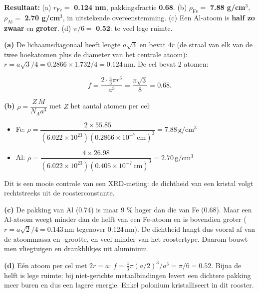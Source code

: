 \begin{oplossing}
\textbf{Resultaat:} (a) \(r_{\mathrm{Fe}} =\) \textbf{0.124 nm}, pakkingsfractie \textbf{0.68}. (b) \(\rho_{\mathrm{Fe}} =\) \textbf{7.88 g/cm\ensuremath{^{3}}}, \(\rho_{\mathrm{Al}} =\) \textbf{2.70 g/cm\ensuremath{^{3}}}, in uitstekende overeenstemming. (c) Een Al-atoom is \textbf{half zo zwaar} en \textbf{groter}. (d) \(\pi/6 =\) \textbf{0.52}: te veel lege ruimte.

\textbf{(a)} De lichaamsdiagonaal heeft lengte \(a\sqrt{3}\) en bevat \(4r\) (de straal van elk van de twee hoekatomen plus de diameter van het centrale atoom): \(r = a\sqrt{3}/4 = 0.2866 \times 1.732/4 = 0.124\,\mathrm{nm}\). De cel bevat 2 atomen:

\[
f = \frac{2\cdot\frac{4}{3}\pi r^3}{a^3} = \frac{\pi\sqrt{3}}{8} = 0.68.
\]

\textbf{(b)} \(\rho = \dfrac{Z\,M}{N_A a^3}\) met \(Z\) het aantal atomen per cel:

\begin{itemize}
\item
  Fe: \(\rho = \dfrac{2 \times 55.85}{(6.022\times10^{23})(0.2866\times10^{-7}\,\mathrm{cm})^3} = 7.88\,\mathrm{g/cm^3}\)
\item
  Al: \(\rho = \dfrac{4 \times 26.98}{(6.022\times10^{23})(0.405\times10^{-7}\,\mathrm{cm})^3} = 2.70\,\mathrm{g/cm^3}\)
\end{itemize}

Dit is een mooie controle van een XRD-meting: de dichtheid van een kristal volgt rechtstreeks uit de roosterconstante.

\textbf{(c)} De pakking van Al (0.74) is maar 9 \% hoger dan die van Fe (0.68). Maar een Al-atoom weegt minder dan de helft van een Fe-atoom en is bovendien groter (\(r = a\sqrt{2}/4 = 0.143\,\mathrm{nm}\) tegenover \(0.124\,\mathrm{nm}\)). De dichtheid hangt dus vooral af van de atoommassa en -grootte, en veel minder van het roostertype. Daarom bouwt men vliegtuigen en drankblikjes uit aluminium.

\textbf{(d)} Eén atoom per cel met \(2r = a\): \(f = \frac{4}{3}\pi(a/2)^3/a^3 = \pi/6 = 0.52\). Bijna de helft is lege ruimte; bij niet-gerichte metaalbindingen levert een dichtere pakking meer buren en dus een lagere energie. Enkel polonium kristalliseert in dit rooster.
\end{oplossing}

